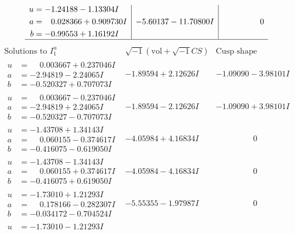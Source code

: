 \documentclass[1p]{elsarticle_modified}
\theoremstyle{definition}
\newcommand{\I}{\sqrt{-1}}
\begin{document}
$$\begin{array}{c|c|c}
\begin{aligned}
u &= -1.24188 - 1.13304 I \\
a &= \phantom{-}0.028366 + 0.909730 I \\
b &= -0.99553 + 1.16192 I\end{aligned}
 & -5.60137 - 11.70800 I & \phantom{-0.000000 } 0\\
 \hline 
 \end{array}$$\newpage$$\begin{array}{c|c|c}  
\text{Solutions to }I^u_{1}& \I (\text{vol} + \sqrt{-1}CS) & \text{Cusp shape}\\
 \hline 
\begin{aligned}
u &= \phantom{-}0.003667 + 0.237046 I \\
a &= -2.94819 - 2.24065 I \\
b &= -0.520327 + 0.707073 I\end{aligned}
 & -1.89594 + 2.12626 I & -1.09090 - 3.98101 I \\ \hline\begin{aligned}
u &= \phantom{-}0.003667 - 0.237046 I \\
a &= -2.94819 + 2.24065 I \\
b &= -0.520327 - 0.707073 I\end{aligned}
 & -1.89594 - 2.12626 I & -1.09090 + 3.98101 I \\ \hline\begin{aligned}
u &= -1.43708 + 1.34143 I \\
a &= \phantom{-}0.060155 - 0.374617 I \\
b &= -0.416075 - 0.619050 I\end{aligned}
 & -4.05984 + 4.16834 I & \phantom{-0.000000 } 0 \\ \hline\begin{aligned}
u &= -1.43708 - 1.34143 I \\
a &= \phantom{-}0.060155 + 0.374617 I \\
b &= -0.416075 + 0.619050 I\end{aligned}
 & -4.05984 - 4.16834 I & \phantom{-0.000000 } 0 \\ \hline\begin{aligned}
u &= -1.73010 + 1.21293 I \\
a &= \phantom{-}0.178166 - 0.282307 I \\
b &= -0.034172 - 0.704524 I\end{aligned}
 & -5.55355 - 1.97987 I & \phantom{-0.000000 } 0 \\ \hline\begin{aligned}
u &= -1.73010 - 1.21293 I \\

\end{aligned}
\end{array}$$
\end{document}
